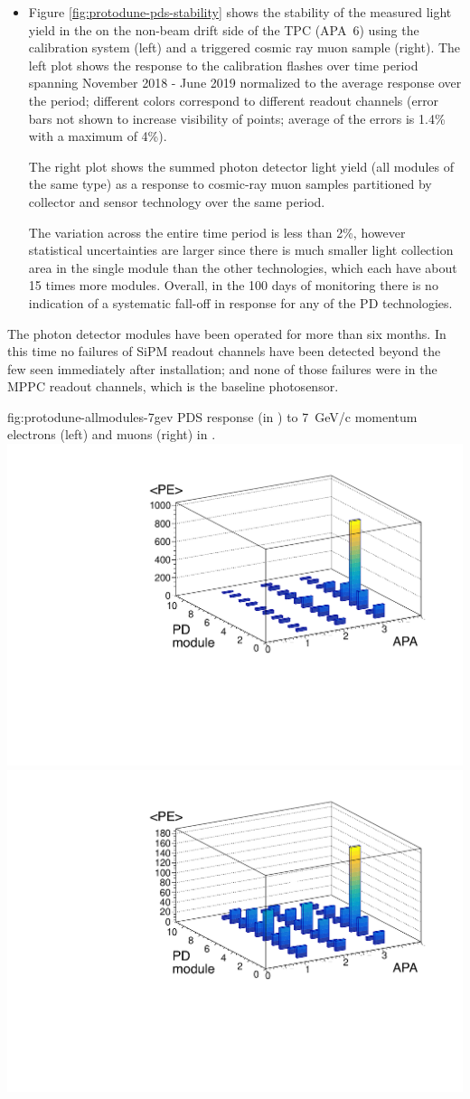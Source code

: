 \begin{itemize}
    \item Figure \ref{fig:protodune-pds-stability} shows the stability of the measured light yield in the  on the non-beam drift side of the TPC (APA~6) using the calibration system (left) and a triggered cosmic ray muon sample (right). The left plot shows the response to the calibration flashes over time period spanning November 2018 - June 2019 normalized to the average response over the period; different colors correspond to different readout channels (error bars not shown to increase visibility of points; average of the errors is 1.4\% with a maximum of 4\%). 
  
    The right plot shows the summed photon detector light yield (all modules of the same type) as a response to cosmic-ray muon samples partitioned by collector and sensor technology over the same period. 
    
  
    The  variation across the entire time period is less than 2\%, however statistical uncertainties are larger since there is much smaller light collection area in the single  module than the other technologies, which each have about 15 times more modules. Overall, in the 100 days of monitoring there is no indication of a systematic fall-off in response for any of the PD technologies. 

\end{itemize}

The  photon detector modules have been operated for more than six months.  In this time no failures of SiPM readout channels have been detected beyond the few seen immediately after installation;  and none of those failures were in the MPPC readout channels, which is the baseline photosensor. 

\begin{dunefigure}{fig:protodune-allmodules-7gev}
{PDS response (in \phel) to \SI{7}{GeV/c} momentum electrons (left) and muons (right) in .}
\includegraphics[angle=0,width=0.48\columnwidth]{graphics/pds-electrons-pd-modules.pdf}
\includegraphics[angle=0,width=0.48\columnwidth]{graphics/pds-muons-pd-modules.pdf}
\end{dunefigure}

